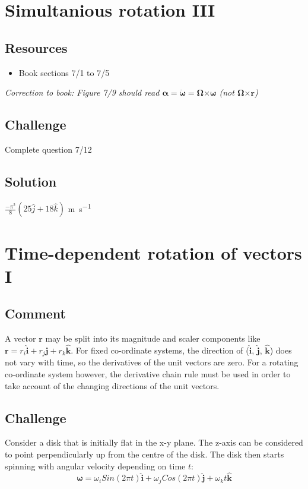\newpage
\section{Simultanious rotation III}

\subsection*{Resources}
\begin{itemize}
    \item Book sections 7/1 to 7/5
\end{itemize}

\emph{Correction to book: Figure 7/9 should read $\bm{\alpha} = \bm{\dot{\omega}} = \bm{\Omega} \bm{\times} \bm{\omega}$ (not $\bm{\Omega} \bm{\times} \bm{r}$)}

\subsection*{Challenge}
Complete question 7/12


\subsection*{Solution}
$\frac{-\pi^2}{8}(25 \hat{j} + 18 \hat{k})$ \si{\meter\per\second}




\newpage
\section{Time-dependent rotation of vectors I}

\subsection*{Comment}
A vector $\bm{r}$ may be split into its magnitude and scaler components like $\bm{r} = r_i \bm{\hat{i}} + r_j \bm{\hat{j}} + r_k \bm{\hat{k}}$. For fixed co-ordinate systems, the direction of ($\bm{\hat{i}}$, $\bm{\hat{j}}$, $\bm{\hat{k}}$) does not vary with time, so the derivatives of the unit vectors are zero. For a rotating co-ordinate system however, the derivative chain rule must be used in order to take account of the changing directions of the unit vectors.

\subsection*{Challenge}
Consider a disk that is initially flat in the x-y plane. The z-axis can be considered to point perpendicularly up from the centre of the disk. The disk then starts spinning with angular velocity depending on time $t$:
\begin{equation}
    \bm{\omega} = \omega_i Sin(2 \pi t) \bm{\hat{i}} + \omega_j Cos(2 \pi t) \bm{\hat{j}} + \omega_k t \bm{\hat{k}}
\end{equation}

